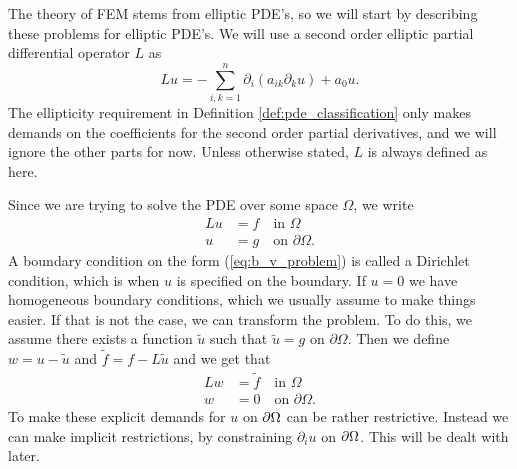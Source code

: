 \iffalse 
\section{Boundary or Initial Value Problems}
When working with ODE's,
whether a problem explicitly states the boundary conditions 
or the initial values does not affect whether a problem can be solved.
When working with 
PDE's that is no longer the case. The different types 
of PDE's demand differently posed problems. 


----THE ABOVE\@: SKAL DET OVERHOVEDET MED?----
\fi

The theory of FEM stems from elliptic PDE's, so we will start by
describing these problems for elliptic PDE's.
We will use a second order elliptic partial differential operator $L$ as 
\begin{equation}
    Lu = - \sum_{i,k=1}^n \partial_i(a_{ik} \partial_k u)+ a_0u.
    \label{eq:Lu}
\end{equation}
The ellipticity requirement in Definition \ref{def:pde_classification} only 
makes demands on the coefficients for the second order partial derivatives, 
and we will ignore the other parts for now. Unless otherwise stated, $L$ is 
always defined as here.
\iffalse
We therefore assume that we can write a general linear PDE of second 
order with $n$ variables as 
\begin{equation*}
    Lu = f.
\end{equation*}
\fi
Since we are trying to solve the PDE over some space $\Omega$, we write
\begin{align}
    Lu &= f \quad \text{in } \Omega \label{eq:b_v_problem} \\
    u &= g \quad \text{on } \partial \Omega. \nonumber
\end{align}
A boundary condition on the form (\ref{eq:b_v_problem}) is called a 
Dirichlet condition, which is when $u$ is specified on the boundary. 
If $u=0$ we have homogeneous boundary conditions, which we usually assume 
to make things easier. If that is not the case, we can
transform the problem. To do this, we assume there exists a function 
$\tilde{u}$ such that $\tilde{u}=g$ on $\partial \Omega$. Then we define 
$w = u - \tilde{u}$ and $\tilde{f}=f-L\tilde{u}$ and we get that
\begin{align}
    Lw &= \tilde{f} \quad \text{in } \Omega \label{eq:b_v_problem_homogeneous} \\
    w &= 0 \quad \text{on } \partial \Omega. \nonumber
\end{align}
To make these explicit demands for $u$ on $\partial \Omega$ can 
be rather restrictive.
Instead we can make implicit restrictions, by constraining 
$\partial _i u$ on $\partial \Omega$.
This will be dealt with later.